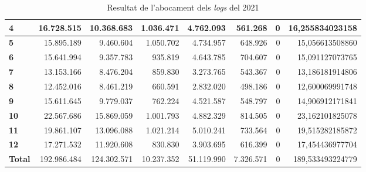 \begin{table}[h!]
\begin{adjustbox}{width=1.2\textwidth, center}
\begin{tabular}{|l|r|r|r|r|r|r|r|}
            \textbf{4}     & 16.728.515  & 10.368.683  & 1.036.471  & 4.762.093  & 561.268   & 0 & 16,255834023158  \\
            \midrule
            \textbf{5}     & 15.895.189  & 9.460.604   & 1.050.702  & 4.734.957  & 648.926   & 0 & 15,056613508860  \\
            \textbf{6}     & 15.641.994  & 9.357.783   & 935.819    & 4.643.785  & 704.607   & 0 & 15,091127073765  \\
            \textbf{7}     & 13.153.166  & 8.476.204   & 859.830    & 3.273.765  & 543.367   & 0 & 13,186181914806  \\
            \textbf{8}     & 12.452.016  & 8.461.219   & 660.591    & 2.832.020  & 498.186   & 0 & 12,600069991748  \\
            \midrule
            \textbf{9}     & 15.611.645  & 9.779.037   & 762.224    & 4.521.587  & 548.797   & 0 & 14,906912171841  \\
            \textbf{10}    & 22.567.686  & 15.869.059  & 1.001.793  & 4.882.329  & 814.505   & 0 & 23,162101825078  \\
            \textbf{11}    & 19.861.107  & 13.096.088  & 1.021.214  & 5.010.241  & 733.564   & 0 & 19,515282185872  \\
            \textbf{12}    & 17.271.532  & 11.920.608  & 830.830    & 3.903.695  & 616.399   & 0 & 17,454436977704  \\
            \midrule
            \textbf{Total} & 192.986.484 & 124.302.571 & 10.237.352 & 51.119.990 & 7.326.571 & 0 & 189,533493224779 \\
            \bottomrule
        \end{tabular}
    \end{adjustbox}
    \caption{Resultat de l'abocament dels \textit{logs} del 2021}
    \label{tab:logs-table-2021}
\end{table}
